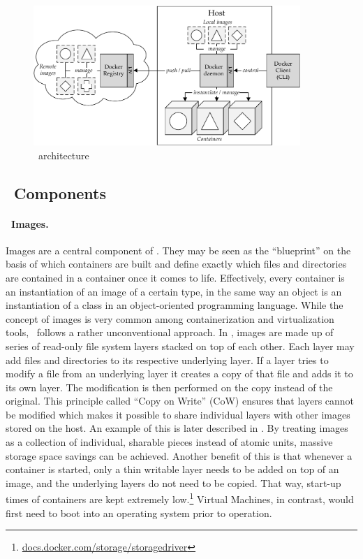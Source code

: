 \begin{figure}[htpb]
  \centering
  \includegraphics[width=0.9\textwidth]{figures/docker-arch.pdf}
  \caption[\docker\ architecture]{\docker\ architecture}\label{fig:docker-arch}
\end{figure}

\pagebreak
\subsection{\docker\ Components}
\paragraph{\docker\ Images.}
Images are a central component of \docker . They may be seen as the ``blueprint'' on the basis of which containers are built and define exactly which files and directories are contained in a container once it comes to life. Effectively, every container is an instantiation of an image of a certain type, in the same way an object is an instantiation of a class in an object-oriented programming language. While the concept of images is very common among containerization and virtualization tools, \docker\ follows a rather unconventional approach.
In \docker , images are made up of series of read-only file system layers stacked on top of each other. Each layer may add files and directories to its respective underlying layer. If a layer tries to modify a file from an underlying layer it creates a copy of that file and adds it to its own layer. The modification is then performed on the copy instead of the original. This principle called ``Copy on Write'' (CoW) ensures that layers cannot be modified which makes it possible to share individual layers with other images stored on the host. An example of this is later described in . By treating images as a collection of individual, sharable pieces instead of atomic units, massive storage space savings can be achieved. Another benefit of this is that whenever a container is started, only a thin writable layer needs to be added on top of an image, and the underlying layers do not need to be copied. That way, start-up times of containers are kept extremely low.\footnote{\url{docs.docker.com/storage/storagedriver}} Virtual Machines, in contrast, would first need to boot into an operating system prior to operation.

